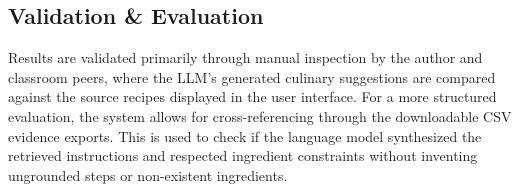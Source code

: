 \documentclass[paper=a4, fontsize=11pt]{scrartcl} %
\begin{document}
\subsection{Validation \& Evaluation}
Results are validated primarily through manual inspection by the author and classroom peers, where the LLM's generated culinary suggestions are compared against the source recipes displayed in the user interface. For a more structured evaluation, the system allows for cross-referencing through the downloadable CSV evidence exports. This is used to check if the language model synthesized the retrieved instructions and respected ingredient constraints without inventing ungrounded steps or non-existent ingredients.

\newpage

\end{document}
